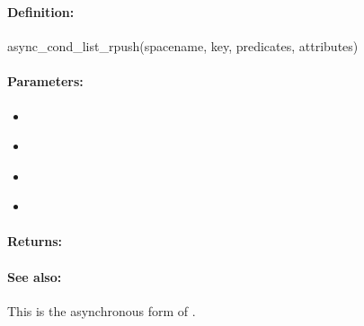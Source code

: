 \pagebreak
\subsubsection{}
\label{api:ruby:async_cond_list_rpush}


\paragraph{Definition:}
\begin{rubycode}
async_cond_list_rpush(spacename, key, predicates, attributes)
\end{rubycode}

\paragraph{Parameters:}
\begin{itemize}[noitemsep]
\item {}\\

\item {}\\

\item {}\\

\item {}\\

\end{itemize}

\paragraph{Returns:}


\paragraph{See also:}  This is the asynchronous form of .

\pagebreak
\subsubsection{}
\label{api:ruby:group_list_rpush}


